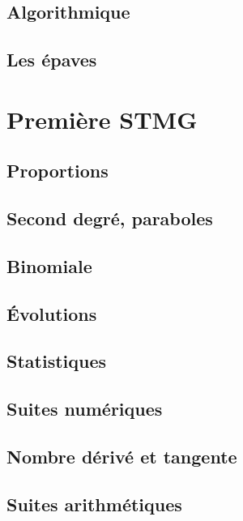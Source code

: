 \documentclass[a4paper,12pt]{book}
\begin{document}
\chapter{Algorithmique}


\chapter{Les épaves}


\part{Première STMG}
\chapter{Proportions}


\chapter{Second degré, paraboles}


\chapter{Binomiale}


\chapter{Évolutions}


\chapter{Statistiques}


\chapter{Suites numériques}


\chapter{Nombre dérivé et tangente}


\chapter{Suites arithmétiques}

\end{document}

